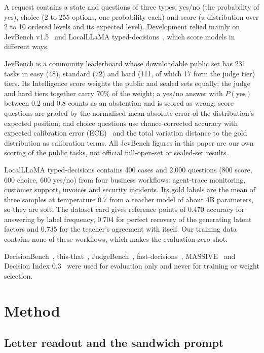 \documentclass[10pt]{article}
\begin{document}
A request contains a state and questions of three types: yes/no (the probability of yes), choice (2 to 255 options, one probability each) and score (a distribution over 2 to 10 ordered levels and its expected level).
Development relied mainly on JevBench v1.5~\cite{jevbench} and LocalLLaMA typed-decisions~\cite{localllama}, which score models in different ways.

JevBench is a community leaderboard whose downloadable public set has 231 tasks in easy (48), standard (72) and hard (111, of which 17 form the judge tier) tiers.
Its Intelligence score weights the public and sealed sets equally; the judge and hard tiers together carry 70\% of the weight; a yes/no answer with $P(\text{yes})$ between 0.2 and 0.8 counts as an abstention and is scored as wrong; score questions are graded by the normalised mean absolute error of the distribution's expected position; and choice questions use chance-corrected accuracy with expected calibration error (ECE)~\cite{guo} and the total variation distance to the gold distribution as calibration terms.
All JevBench figures in this paper are our own scoring of the public tasks, not official full-open-set or sealed-set results.

LocalLLaMA typed-decisions contains 400 cases and 2,000 questions (800 score, 600 choice, 600 yes/no) from four business workflows: agent-trace monitoring, customer support, invoices and security incidents.
Its gold labels are the mean of three samples at temperature 0.7 from a teacher model of about 4B parameters, so they are soft.
The dataset card gives reference points of 0.470 accuracy for answering by label frequency, 0.704 for perfect recovery of the generating latent factors and 0.735 for the teacher's agreement with itself.
Our training data contains none of these workflows, which makes the evaluation zero-shot.

DecisionBench~\cite{decisionbench}, this-that~\cite{thisthat}, JudgeBench~\cite{judgebench}, fast-decisions~\cite{fastdecisions}, MASSIVE~\cite{massive} and Decision Index 0.3~\cite{decisionindex} were used for evaluation only and never for training or weight selection.

\section{Method}

\subsection{Letter readout and the sandwich prompt}
\label{sec:readout}
\end{document}
